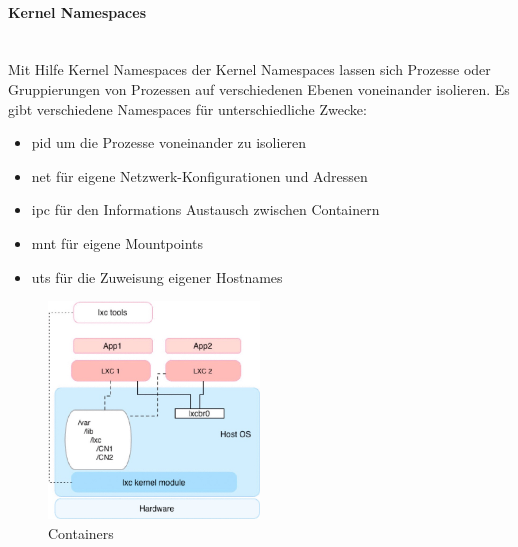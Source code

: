 \paragraph{Kernel Namespaces } \mbox{} \\
\noindent Mit Hilfe Kernel Namespaces der Kernel Namespaces lassen sich Prozesse oder Gruppierungen von Prozessen auf verschiedenen Ebenen voneinander isolieren. Es gibt verschiedene Namespaces für unterschiedliche Zwecke:
\begin{itemize}
  \item pid um die Prozesse voneinander zu isolieren \cite{lnpid}
  \item net für eigene Netzwerk-Konfigurationen und Adressen \cite{lnnet}
  \item ipc für den Informations Austausch zwischen Containern \cite{lnipc}
  \item mnt für eigene Mountpoints \cite{lnns}
  \item uts für die Zuweisung eigener Hostnames \cite{lnuts}
\end{itemize}

\begin{figure}[!ht]
  \centering
  \includegraphics[width=0.5\textwidth]{images/containers.jpg}
  \caption{Containers \cite{6903537}}
\end{figure}

